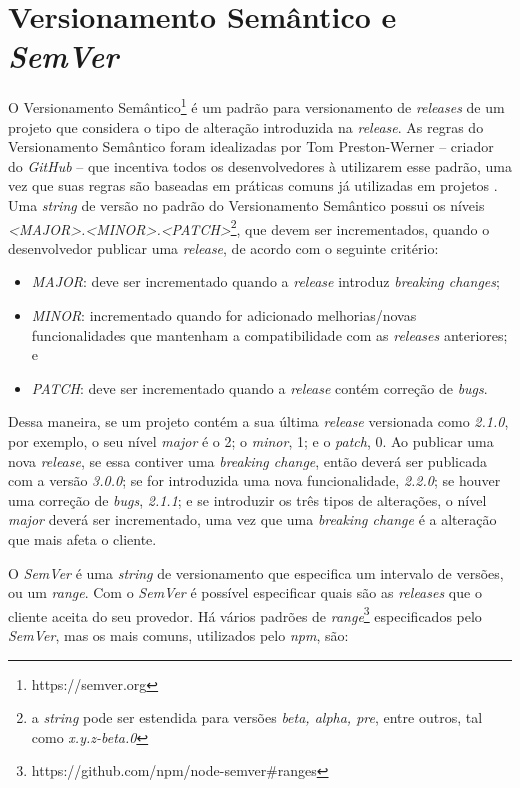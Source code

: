 \section{Versionamento Semântico e \textit{SemVer}}
\label{ref-teo:semver}

O Versionamento Semântico\footnote{https://semver.org} é um padrão para versionamento de \textit{releases} de um projeto que considera o tipo de alteração introduzida na \textit{release}. As regras do Versionamento Semântico foram idealizadas por Tom Preston-Werner -- criador do \textit{GitHub} -- que incentiva todos os desenvolvedores à utilizarem esse padrão, uma vez que suas regras são baseadas em práticas comuns já utilizadas em projetos \cite{teorical_reference:semver}. Uma \textit{string} de versão no padrão do Versionamento Semântico possui os níveis \textit{<MAJOR>.<MINOR>.<PATCH>}\footnote{a \textit{string} pode ser estendida para versões \textit{beta, alpha, pre}, entre outros, tal como \textit{x.y.z-beta.0}}, que devem ser incrementados, quando o desenvolvedor publicar uma \textit{release}, de acordo com o seguinte critério:

\begin{itemize}
    \item \textit{MAJOR}: deve ser incrementado quando a \textit{release} introduz \textit{breaking changes};
    \item \textit{MINOR}: incrementado quando for adicionado melhorias/novas funcionalidades que mantenham a compatibilidade com as \textit{releases} anteriores; e
    \item \textit{PATCH}: deve ser incrementado quando a \textit{release} contém correção de \textit{bugs}.
\end{itemize}{}

Dessa maneira, se um projeto contém a sua última \textit{release} versionada como \textit{2.1.0}, por exemplo, o seu nível \textit{major} é o 2; o \textit{minor}, 1; e o \textit{patch}, 0. Ao publicar uma nova \textit{release}, se essa contiver uma \textit{breaking change}, então deverá ser publicada com a versão \textit{3.0.0}; se for introduzida uma nova funcionalidade, \textit{2.2.0}; se houver uma correção de \textit{bugs}, \textit{2.1.1}; e se introduzir os três tipos de alterações, o nível \textit{major} deverá ser incrementado, uma vez que uma \textit{breaking change} é a alteração que mais afeta o cliente.

O \textit{SemVer} é uma \textit{string} de versionamento que especifica um intervalo de versões, ou um \textit{range}. Com o \textit{SemVer} é possível especificar quais são as \textit{releases} que o cliente aceita do seu provedor. Há vários padrões de \textit{range}\footnote{https://github.com/npm/node-semver\#ranges} especificados pelo \textit{SemVer}, mas os mais comuns, utilizados pelo \textit{npm}, são:

